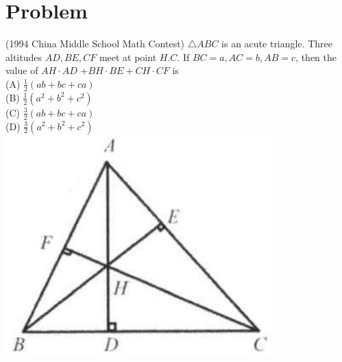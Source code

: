 \documentclass{article}
\begin{document}
\section*{Problem}
(1994 China Middle School Math Contest) \(\triangle A B C\) is an acute triangle. Three altitudes \(A D, B E, C F\) meet at point \(H . C\). If \(B C=a, A C=b, A B=c\), then the value of \(A H \cdot A D\) \(+B H \cdot B E+C H \cdot C F\) is\\
(A) \(\frac{1}{2}(a b+b c+c a)\)\\
(B) \(\frac{1}{2}\left(a^{2}+b^{2}+c^{2}\right)\)\\
(C) \(\frac{3}{2}(a b+b c+c a)\)\\
(D) \(\frac{3}{2}\left(a^{2}+b^{2}+c^{2}\right)\)\\
\centering
\includegraphics[width=\textwidth]{images/207(1).jpg}
\end{document}
